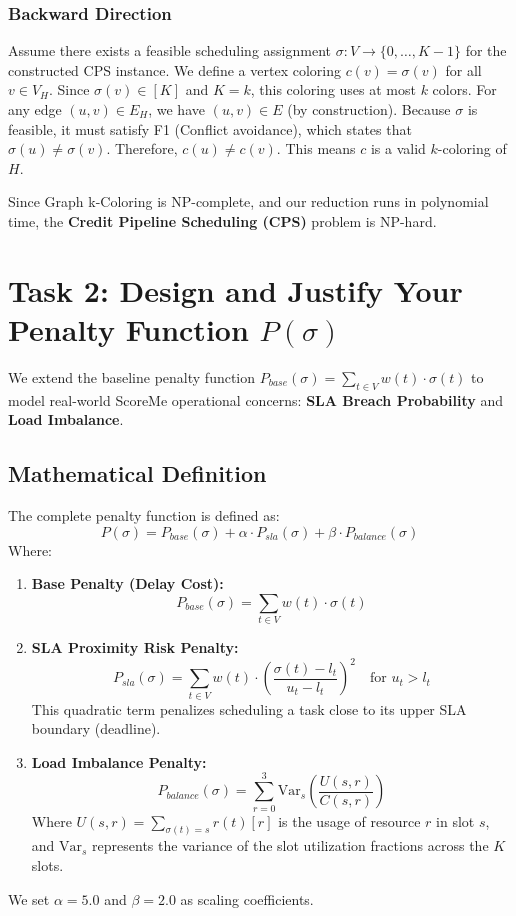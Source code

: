\documentclass[11pt,a4paper]{article}
\begin{document}
\subsubsection{Backward Direction}
Assume there exists a feasible scheduling assignment $\sigma: V \to \{0, \dots, K-1\}$ for the constructed CPS instance.
We define a vertex coloring $c(v) = \sigma(v)$ for all $v \in V_H$. Since $\sigma(v) \in [K]$ and $K = k$, this coloring uses at most $k$ colors.
For any edge $(u, v) \in E_H$, we have $(u, v) \in E$ (by construction).
Because $\sigma$ is feasible, it must satisfy F1 (Conflict avoidance), which states that $\sigma(u) \neq \sigma(v)$.
Therefore, $c(u) \neq c(v)$. This means $c$ is a valid $k$-coloring of $H$.

Since Graph k-Coloring is NP-complete, and our reduction runs in polynomial time, the \textbf{Credit Pipeline Scheduling (CPS)} problem is NP-hard.

\newpage

\section{Task 2: Design and Justify Your Penalty Function $P(\sigma)$}

We extend the baseline penalty function $P_{base}(\sigma) = \sum_{t \in V} w(t) \cdot \sigma(t)$ to model real-world ScoreMe operational concerns: \textbf{SLA Breach Probability} and \textbf{Load Imbalance}.

\subsection{Mathematical Definition}
The complete penalty function is defined as:
\[ P(\sigma) = P_{base}(\sigma) + \alpha \cdot P_{sla}(\sigma) + \beta \cdot P_{balance}(\sigma) \]
Where:
\begin{enumerate}
    \item \textbf{Base Penalty (Delay Cost):}
    \[ P_{base}(\sigma) = \sum_{t \in V} w(t) \cdot \sigma(t) \]
    \item \textbf{SLA Proximity Risk Penalty:}
    \[ P_{sla}(\sigma) = \sum_{t \in V} w(t) \cdot \left( \frac{\sigma(t) - l_t}{u_t - l_t} \right)^2 \quad \text{for } u_t > l_t \]
    This quadratic term penalizes scheduling a task close to its upper SLA boundary (deadline).
    \item \textbf{Load Imbalance Penalty:}
    \[ P_{balance}(\sigma) = \sum_{r=0}^{3} \text{Var}_s \left( \frac{U(s, r)}{C(s, r)} \right) \]
    Where $U(s, r) = \sum_{\sigma(t)=s} r(t)[r]$ is the usage of resource $r$ in slot $s$, and $\text{Var}_s$ represents the variance of the slot utilization fractions across the $K$ slots.
\end{enumerate}
We set $\alpha = 5.0$ and $\beta = 2.0$ as scaling coefficients.
\end{document}
